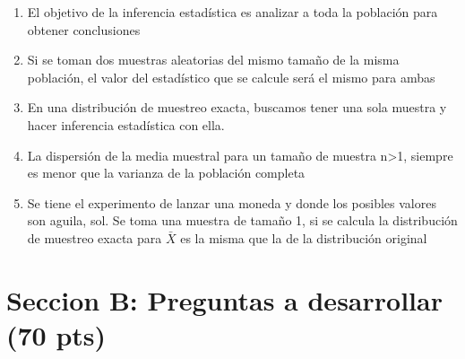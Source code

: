 \documentclass[addpoints]{exam}
\theoremstyle{mytheor}
\begin{document}
\begin{questions}
  \begin{enumerate}
  \item El objetivo de la inferencia estadística es analizar a toda la población para obtener conclusiones
  \item Si se toman dos muestras aleatorias del mismo tamaño de la misma población, el valor del estadístico que se calcule será el mismo para ambas
  \item En una distribución de muestreo exacta, buscamos tener una sola muestra y hacer inferencia estadística con ella. 
  \item La dispersión de la media muestral para un tamaño de muestra n>1, siempre es menor que la varianza de la población completa
  \item Se tiene el experimento de lanzar una moneda y donde los posibles valores son {aguila, sol}. Se toma una muestra de tamaño 1, si se calcula la distribución de muestreo exacta para $\bar{X}$ es la misma que la de la distribución original
  \end{enumerate}
  
  
\end{questions}
  
  \section*{Seccion B: Preguntas a desarrollar (70 pts)}
  
\end{document}
